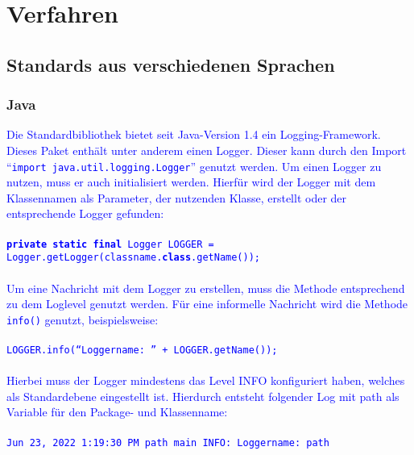 \chapter{Verfahren}\label{ch:verfahren}


\section{Standards aus verschiedenen Sprachen}\label{sec:standards-aus-verschiedenen-sprachen}

\subsection{Java}\label{subsec:java}
\textcolor{blue}{
    Die Standardbibliothek bietet seit Java-Version 1.4 ein Logging-Framework.
    Dieses Paket enthält unter anderem einen Logger.
    Dieser kann durch den Import \enquote{\texttt{import java.util.logging.Logger}} genutzt werden.
    Um einen Logger zu nutzen, muss er auch initialisiert werden.
    Hierfür wird der Logger mit dem Klassennamen als Parameter, der nutzenden Klasse, erstellt oder der entsprechende Logger gefunden:
    \\
    \\
    \hspace*{10mm}
    \texttt{\textbf{private static final} Logger LOGGER =
        \\
        \hspace*{30mm}Logger.getLogger(classname.\textbf{class}.getName());}
    \\
    \\
    Um eine Nachricht mit dem Logger zu erstellen, muss die Methode entsprechend zu dem Loglevel genutzt werden.
    Für eine informelle Nachricht wird die Methode \texttt{info()} genutzt, beispielsweise:
    \\
    \\
    \hspace*{10mm}
    \texttt{LOGGER.info(\enquote{Loggername: } + LOGGER.getName());}
    \\
    \\
    Hierbei muss der Logger mindestens das Level INFO konfiguriert haben, welches als Standardebene eingestellt ist.
    Hierdurch entsteht folgender Log mit path als Variable für den Package- und Klassenname:
    \\
    \\
    \hspace*{10mm}
    \texttt{Jun 23, 2022 1:19:30 PM path main INFO: Loggername: path}
}
